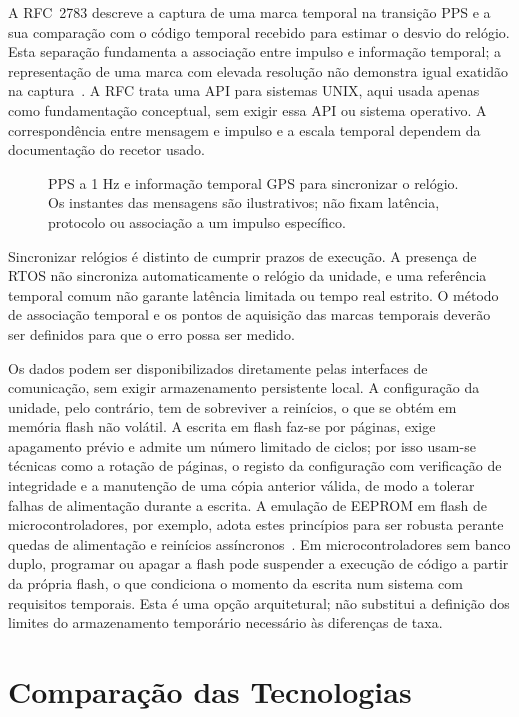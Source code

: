 A RFC~2783 descreve a captura de uma marca temporal na transição PPS
e a sua comparação com o código temporal recebido para estimar o desvio
do relógio. Esta separação fundamenta a associação entre impulso e
informação temporal; a representação de uma marca com elevada resolução
não demonstra igual exatidão na captura~\cite[secs.~1--2]{mogul_pps_2000}.
A RFC trata uma API para sistemas UNIX, aqui usada apenas como
fundamentação conceptual, sem exigir essa API ou sistema operativo.
A correspondência entre mensagem e impulso e a escala temporal dependem
da documentação do recetor usado.

\begin{figure}[htbp]
    \centering
    \caption[Referência temporal PPS/GPS.]{PPS a 1 Hz e informação temporal GPS para sincronizar o relógio. Os instantes das mensagens são ilustrativos; não fixam latência, protocolo ou associação a um impulso específico.}
    \label{fig:pps-gps}
\end{figure}

Sincronizar relógios é distinto de cumprir prazos de execução. A presença
de RTOS não sincroniza automaticamente o relógio da unidade, e uma
referência temporal comum não garante latência limitada ou tempo real
estrito. O método de associação temporal e os pontos de aquisição das
marcas temporais deverão ser definidos para que o erro possa ser medido.

Os dados podem ser disponibilizados diretamente pelas interfaces de
comunicação, sem exigir armazenamento persistente local. A configuração
da unidade, pelo contrário, tem de sobreviver a reinícios, o que se obtém
em memória flash não volátil. A escrita em flash faz-se por páginas,
exige apagamento prévio e admite um número limitado de ciclos; por isso
usam-se técnicas como a rotação de páginas, o registo da configuração com
verificação de integridade e a manutenção de uma cópia anterior válida,
de modo a tolerar falhas de alimentação durante a escrita. A emulação de
EEPROM em flash de microcontroladores, por exemplo, adota estes princípios
para ser robusta perante quedas de alimentação e reinícios
assíncronos~\cite{st_an4894}. Em microcontroladores sem banco duplo,
programar ou apagar a flash pode suspender a execução de código a partir
da própria flash, o que condiciona o momento da escrita num sistema com
requisitos temporais. Esta é uma opção arquitetural; não substitui a
definição dos limites do armazenamento temporário necessário às
diferenças de taxa.

\section{Comparação das Tecnologias}

